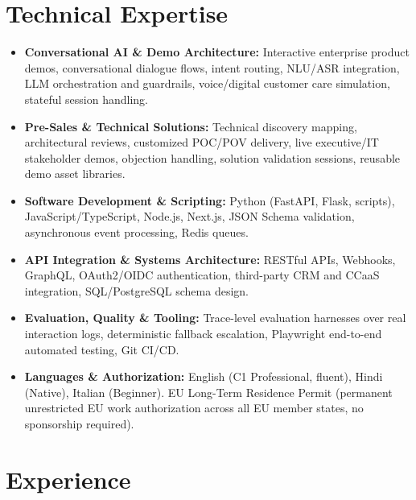 \documentclass[10pt,a4paper]{article}
\begin{document}
\section{Technical Expertise}
\begin{itemize}
  \item \textbf{Conversational AI \& Demo Architecture:} Interactive enterprise product demos, conversational dialogue flows, intent routing, NLU/ASR integration, LLM orchestration and guardrails, voice/digital customer care simulation, stateful session handling.
  \item \textbf{Pre-Sales \& Technical Solutions:} Technical discovery mapping, architectural reviews, customized POC/POV delivery, live executive/IT stakeholder demos, objection handling, solution validation sessions, reusable demo asset libraries.
  \item \textbf{Software Development \& Scripting:} Python (FastAPI, Flask, scripts), JavaScript/TypeScript, Node.js, Next.js, JSON Schema validation, asynchronous event processing, Redis queues.
  \item \textbf{API Integration \& Systems Architecture:} RESTful APIs, Webhooks, GraphQL, OAuth2/OIDC authentication, third-party CRM and CCaaS integration, SQL/PostgreSQL schema design.
  \item \textbf{Evaluation, Quality \& Tooling:} Trace-level evaluation harnesses over real interaction logs, deterministic fallback escalation, Playwright end-to-end automated testing, Git CI/CD.
  \item \textbf{Languages \& Authorization:} English (C1 Professional, fluent), Hindi (Native), Italian (Beginner). EU Long-Term Residence Permit (permanent unrestricted EU work authorization across all EU member states, no sponsorship required).
\end{itemize}

\section{Experience}
\end{document}
